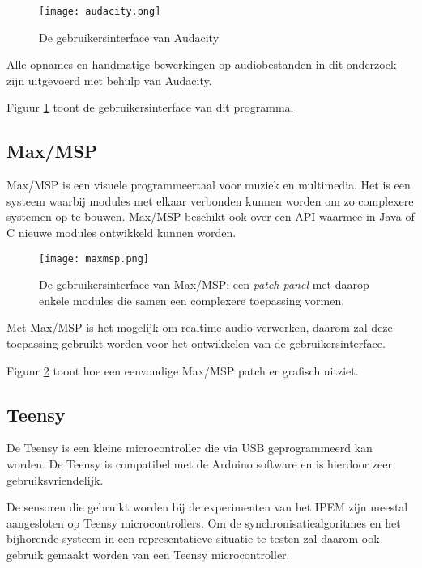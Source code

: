 \begin{figure}[!h]
	\captionsetup{width=0.8\textwidth}
	\caption[Gebruikersinterface van Audacity]{De gebruikersinterface van Audacity}
	\centering
	\advance\parskip0.3cm
	\texttt{[image: audacity.png]}
	\label{screenshot-audacity}
\end{figure}

Alle opnames en handmatige bewerkingen op audiobestanden in dit onderzoek zijn uitgevoerd met behulp van Audacity. 

Figuur \ref{screenshot-audacity} toont de gebruikersinterface van dit programma.

\subsection{Max/MSP}

Max/MSP is een visuele programmeertaal voor muziek en multimedia. Het is een systeem waarbij modules met elkaar verbonden kunnen worden om zo complexere systemen op te bouwen. Max/MSP beschikt ook over een API waarmee in Java of C nieuwe modules ontwikkeld kunnen worden. \cite{cycling2016}

\begin{figure}[!h]
	\captionsetup{width=0.8\textwidth}
	\caption[Gebruikersinterface van MAX/MSP]{De gebruikersinterface van Max/MSP: een \textit{patch panel} met daarop enkele modules die samen een complexere toepassing vormen.}
	\centering
	\advance\parskip0.3cm
	\texttt{[image: maxmsp.png]}
	\label{screenshot-max}
\end{figure}

Met Max/MSP is het mogelijk om realtime audio verwerken, daarom zal deze toepassing gebruikt worden voor het ontwikkelen van de gebruikersinterface. 

Figuur \ref{screenshot-max} toont hoe een eenvoudige Max/MSP patch er grafisch uitziet.

\subsection{Teensy}

De Teensy is een kleine microcontroller die via USB geprogrammeerd kan worden. De Teensy is compatibel met de Arduino software en is hierdoor zeer gebruiksvriendelijk. \cite{teensy2016}

De sensoren die gebruikt worden bij de experimenten van het IPEM zijn meestal aangesloten op Teensy microcontrollers.
Om de synchronisatiealgoritmes en het bijhorende systeem in een representatieve situatie te testen zal daarom ook gebruik gemaakt worden van een Teensy microcontroller.

